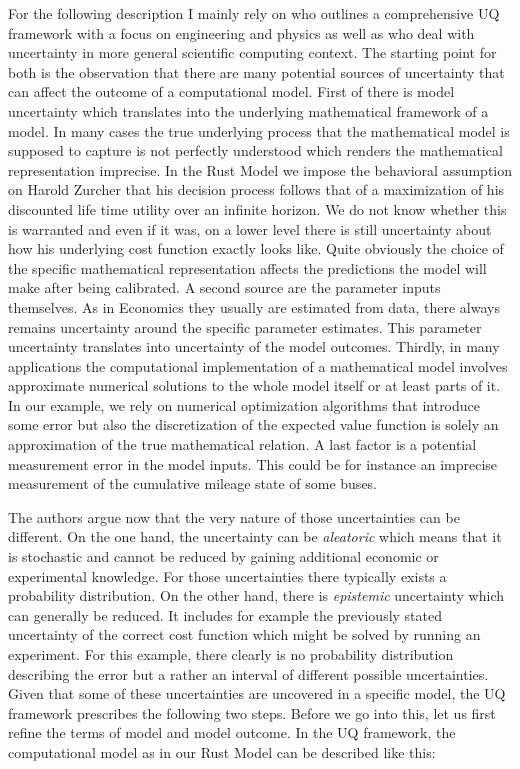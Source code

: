 For the following description I mainly rely on \cite{Smith.2013} who outlines a comprehensive UQ framework with a focus on engineering and physics as well as \cite{Oberkampf.2010} who deal with uncertainty in more general scientific computing context.  The starting point for both is the observation that there are many potential sources of uncertainty that can affect the outcome of a computational model. First of there is model uncertainty which translates into the underlying mathematical framework of a model. In many cases the true underlying process that the mathematical model is supposed to capture is not perfectly understood which renders the mathematical representation imprecise. In the Rust Model we impose the behavioral assumption on Harold Zurcher that his decision process follows that of a maximization of his discounted life time utility over an infinite horizon. We do not know whether this is warranted and even if it was, on a lower level there is still uncertainty about how his underlying cost function exactly looks like. Quite obviously the choice of the specific mathematical representation affects the predictions the model will make after being calibrated. A second source are the parameter inputs themselves. As in Economics they usually are estimated from data, there always remains uncertainty around the specific parameter estimates. This parameter uncertainty translates into uncertainty of the model outcomes. Thirdly, in many applications the computational implementation of a mathematical model involves approximate numerical solutions to the whole model itself or at least parts of it. In our example, we rely on numerical optimization algorithms that introduce some error but also the discretization of the expected value function is solely an approximation of the true mathematical relation. A last factor is a potential measurement error in the model inputs. This could be for instance an imprecise measurement of the cumulative mileage state of some buses.

The authors argue now that the very nature of those uncertainties can be different. On the one hand, the uncertainty can be \textit{aleatoric} which means that it is stochastic and cannot be reduced by gaining additional economic or experimental knowledge. For those uncertainties there typically exists a probability distribution. On the other hand, there is \textit{epistemic} uncertainty which can generally be reduced. It includes for example the previously stated uncertainty of the correct cost function which might be solved by running an experiment. For this example, there clearly is no probability distribution describing the error but a rather an interval of different possible uncertainties. Given that some of these uncertainties are uncovered in a specific model, the UQ framework prescribes the following two steps. Before we go into this, let us first refine the terms of model and model outcome. In the UQ framework, the computational model as in our Rust Model can be described like this:

